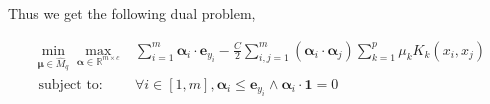 \documentclass{article}
\begin{document}
Thus we get the following dual problem,

\begin{equation}
    \begin{aligned}
        \min _{\boldsymbol{\mu} \in \widehat{M}_{q}} \max _{\boldsymbol{\alpha} \in \mathbb{R}^{m \times c}} & \sum_{i=1}^{m} \boldsymbol{\alpha}_{i} \cdot \mathbf{e}_{y_{i}}-\frac{C}{2} \sum_{i, j=1}^{m}\left(\boldsymbol{\alpha}_{i} \cdot \boldsymbol{\alpha}_{j}\right) \sum_{k=1}^{p} \mu_{k} K_{k}\left(x_{i}, x_{j}\right) \\
        \text { subject to: }                                                                                & \forall i \in[1, m], \boldsymbol{\alpha}_{i} \leq \mathbf{e}_{y_{i}} \wedge \boldsymbol{\alpha}_{i} \cdot \mathbf{1}=0
    \end{aligned}
\end{equation}







\end{document}

